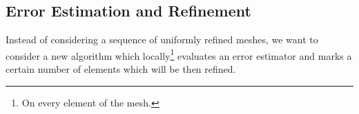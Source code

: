\subsection{Error Estimation and Refinement}

Instead of considering a sequence of uniformly refined meshes, we want to consider a new algorithm which locally\footnote{On every element of the mesh.} evaluates an error estimator and marks a certain number of elements which will be then refined.